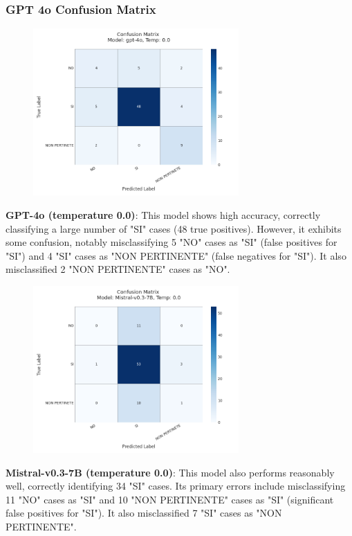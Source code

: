 \documentclass[../main.tex]{subfiles}
\begin{document}
\subsubsection{GPT 4o Confusion Matrix}
\begin{figure}
    \centering
    \includegraphics[width=0.70\textwidth]{Graphs/Confusion Matrix GPT 4o.png}
\end{figure}


\textbf{GPT-4o (temperature 0.0)}: This model shows high accuracy, correctly classifying a large number of "SI" cases (48 true positives). However, it exhibits some confusion, notably misclassifying 5 "NO" cases as "SI" (false positives for "SI") and 4 "SI" cases as "NON PERTINENTE" (false negatives for "SI"). It also misclassified 2 "NON PERTINENTE" cases as "NO".


\begin{figure}
    \includegraphics[width=0.70\textwidth]{Graphs/Confusion Matrix Mistral.png}
\end{figure}

\textbf{Mistral-v0.3-7B (temperature 0.0)}: This model also performs reasonably well, correctly identifying 34 "SI" cases. Its primary errors include misclassifying 11 "NO" cases as "SI" and 10 "NON PERTINENTE" cases as "SI" (significant false positives for "SI"). It also misclassified 7 "SI" cases as "NON PERTINENTE".
\end{document}
